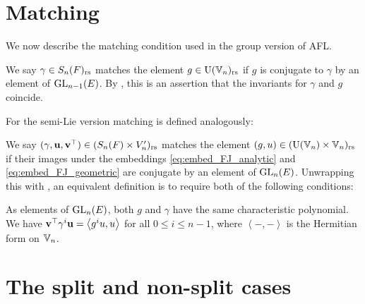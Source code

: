 \section{Matching}
We now describe the matching condition used in the group version of AFL.
\begin{definition}
  We say $\gamma \in S_n(F)_{\mathrm{rs}}$ matches the element $g \in \operatorname{U}(\mathbb V_n)_{\mathrm{rs}}$ if
  $g$ is conjugate to $\gamma$ by an element of $\operatorname{GL}_{n-1}(E)$.
  By , this is an assertion that
  the invariants for $\gamma$ and $g$ coincide.
\end{definition}
For the semi-Lie version matching is defined analogously:
\begin{definition}
  We say $(\gamma, \mathbf u, \mathbf v^\top) \in (S_n(F) \times V_n')_{\mathrm{rs}}$
  matches the element $(g, u) \in (\operatorname{U}(\mathbb V_n) \times \mathbb V_n)_{\mathrm{rs}}$ if
  their images under the embeddings \eqref{eq:embed_FJ_analytic}
  and \eqref{eq:embed_FJ_geometric} are conjugate by an element of $\operatorname{GL}_n(E)$.
  Unwrapping this with ,
  an equivalent definition is to require both of the following conditions:
  \begin{itemize}
    \ii As elements of $\operatorname{GL}_n(E)$,
    both $g$ and $\gamma$ have the same characteristic polynomial.
    \ii We have $\mathbf v^\top \gamma^i \mathbf u = \left< g^i u, u \right>$ for all $0 \le i \le n-1$,
    where $\left< -,- \right>$ is the Hermitian form on $\mathbb V_n$.
  \end{itemize}
\end{definition}

\section{The split and non-split cases}
